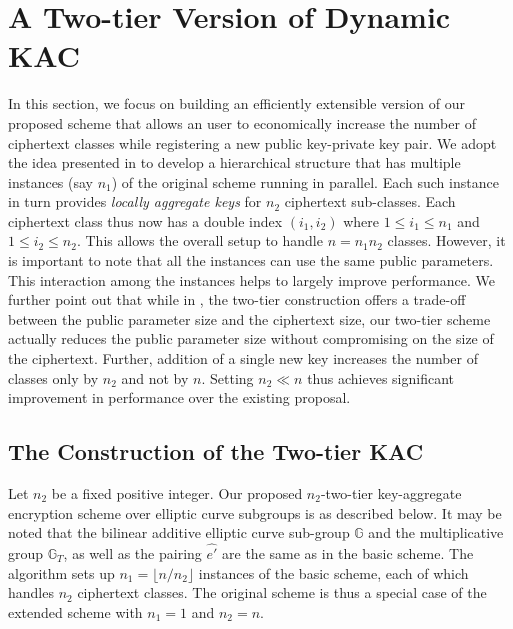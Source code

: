 \section{A Two-tier Version of Dynamic KAC}
\label{sec:general}

In this section, we focus on building an efficiently extensible version of our proposed scheme that allows an user to economically increase the number of ciphertext classes while registering a new public key-private key pair. We adopt the idea presented in \cite{boneh2005collusion} to develop a hierarchical structure that has multiple instances (say $n_1$) of the original scheme running in parallel. Each such instance in turn provides \emph{locally aggregate keys} for $n_2$ ciphertext sub-classes. Each ciphertext class thus now has a double index $(i_1,i_2)$ where $1\leq i_1 \leq n_1$ and $1\leq i_2 \leq n_2$. This allows the overall setup to handle $n=n_1n_2$ classes. However, it is important to note that all the instances can use the same public parameters. This interaction among the instances helps to largely improve performance. We further point out that while in \cite{boneh2005collusion}, the two-tier construction offers a trade-off between the public parameter size and the ciphertext size, our 
two-tier scheme actually reduces the public parameter size without compromising on the size of the ciphertext. Further, addition of a single new key increases the number of classes only by $n_2$ and not by $n$. Setting $n_2\ll n$ thus achieves significant improvement in performance over the existing proposal.


\subsection{The Construction of the Two-tier KAC}
\label{subsec:construction2}

Let $n_2$ be a fixed positive integer. Our proposed $n_2$-two-tier key-aggregate encryption scheme over elliptic curve subgroups is as described below. It may be noted that the bilinear additive elliptic curve sub-group $\mathbb{G}$ and the multiplicative group $\mathbb{G}_T$, as well as the pairing $\hat{e'}$ are the same as in the basic scheme. The algorithm sets up $n_1=\lfloor n/n_2\rfloor$ instances of the basic scheme, each of which handles $n_2$ ciphertext classes. The original scheme is thus a special case of the extended scheme with $n_1=1$ and $n_2=n$.


